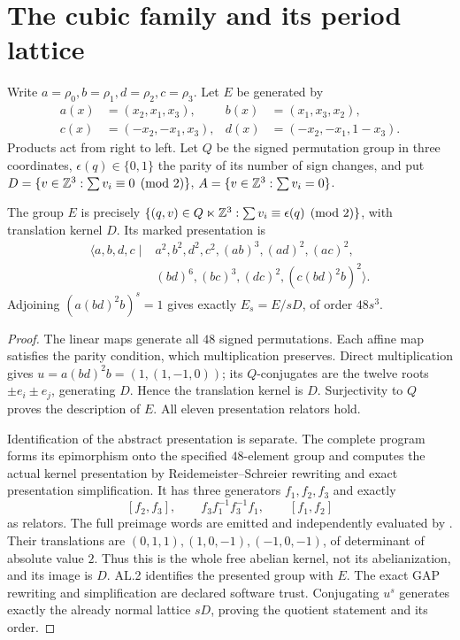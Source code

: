 \section{The cubic family and its period lattice}
Write $a=\rho_0,b=\rho_1,d=\rho_2,c=\rho_3$. Let $E$ be generated by
\begin{align*}
a(x)&=(x_2,x_1,x_3),& b(x)&=(x_1,x_3,x_2),\\
c(x)&=(-x_2,-x_1,x_3),&d(x)&=(-x_2,-x_1,1-x_3).
\end{align*}
Products act from right to left. Let $Q$ be the signed permutation group
in three coordinates, $\epsilon(q)\in\{0,1\}$ the parity of its number of
sign changes, and put
$D=\{v\in\mathbb Z^3:\sum v_i\equiv0\pmod2\}$,
$A=\{v\in\mathbb Z^3:\sum v_i=0\}$.
\begin{lemma}\label{lem:group}
The group $E$ is precisely
$\{(q,v)\in Q\ltimes\mathbb Z^3:\sum v_i\equiv\epsilon(q)\pmod2\}$,
with translation kernel $D$. Its marked presentation is
\begin{align*}
\langle a,b,d,c\mid& a^2,b^2,d^2,c^2,(ab)^3,(ad)^2,(ac)^2,\\
 &(bd)^6,(bc)^3,(dc)^2,(c(bd)^2b)^2\rangle.
\end{align*}
Adjoining $(a(bd)^2b)^s=1$ gives exactly $E_s=E/sD$, of order $48s^3$.
\end{lemma}
\begin{proof}
The linear maps generate all $48$ signed permutations. Each affine
map satisfies the parity condition, which multiplication preserves.
Direct multiplication gives $u=a(bd)^2b=(1,(1,-1,0))$; its $Q$-conjugates
are the twelve roots $\pm e_i\pm e_j$, generating $D$. Hence the
translation kernel is $D$. Surjectivity to $Q$ proves the description of
$E$. All eleven presentation relators hold.

Identification of the abstract presentation is separate. The complete
program  forms its epimorphism onto the
specified $48$-element group and computes the actual kernel presentation
by Reidemeister--Schreier rewriting and exact presentation simplification.
It has three generators $f_1,f_2,f_3$ and exactly
\[
 [f_2,f_3],\qquad f_3f_1^{-1}f_3^{-1}f_1,\qquad [f_1,f_2]
\]
as relators. The full preimage words are emitted and independently
evaluated by . Their translations are
$(0,1,1),(1,0,-1),(-1,0,-1)$, of determinant of absolute value $2$.
Thus this is the whole free abelian kernel, not its abelianization,
and its image is $D$. AL.2 identifies the presented group with $E$.
The exact GAP rewriting and simplification are declared software trust.
Conjugating $u^s$ generates exactly the already normal lattice $sD$,
proving the quotient statement and its order.
\end{proof}

